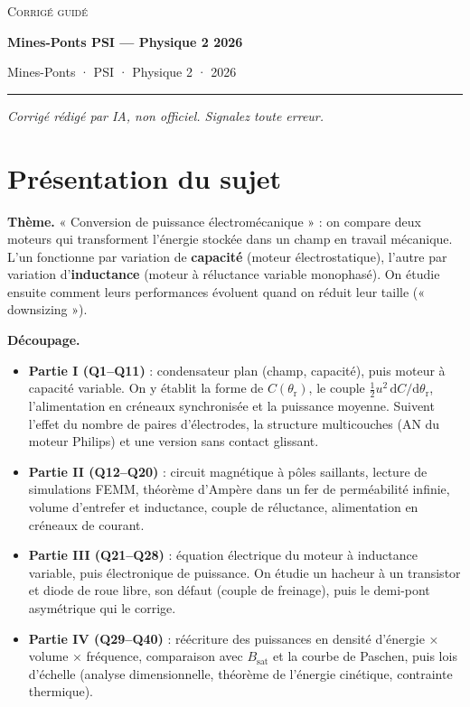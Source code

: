 \documentclass[11pt,a4paper]{article}
\providecommand{\tightlist}{\setlength{\itemsep}{0pt}\setlength{\parskip}{0pt}}
\begin{document}
\thispagestyle{plain}
\begin{center}
  {\small\scshape Corrigé guidé}\par\smallskip
  {\LARGE\bfseries Mines-Ponts PSI — Physique 2 2026\par}\medskip
  {\large Mines-Ponts · PSI · Physique 2 · 2026\par}
\end{center}
\vspace{2pt}\hrule\vspace{8pt}

\emph{Corrigé rédigé par IA, non officiel. Signalez toute erreur.}

\hypertarget{pruxe9sentation-du-sujet}{%
\section{Présentation du sujet}\label{pruxe9sentation-du-sujet}}

\textbf{Thème.} « Conversion de puissance électromécanique » : on compare deux moteurs qui transforment l'énergie stockée dans un champ en travail mécanique. L'un fonctionne par variation de \textbf{capacité} (moteur électrostatique), l'autre par variation d'\textbf{inductance} (moteur à réluctance variable monophasé). On étudie ensuite comment leurs performances évoluent quand on réduit leur taille (« downsizing »).

\textbf{Découpage.}

\begin{itemize}
\tightlist
\item
  \textbf{Partie I (Q1--Q11)} : condensateur plan (champ, capacité), puis moteur à capacité variable. On y établit la forme de \(C(\theta_{\mathrm r})\), le couple \(\tfrac12u^2\,\mathrm dC/\mathrm d\theta_{\mathrm r}\), l'alimentation en créneaux synchronisée et la puissance moyenne. Suivent l'effet du nombre de paires d'électrodes, la structure multicouches (AN du moteur Philips) et une version sans contact glissant.
\item
  \textbf{Partie II (Q12--Q20)} : circuit magnétique à pôles saillants, lecture de simulations FEMM, théorème d'Ampère dans un fer de perméabilité infinie, volume d'entrefer et inductance, couple de réluctance, alimentation en créneaux de courant.
\item
  \textbf{Partie III (Q21--Q28)} : équation électrique du moteur à inductance variable, puis électronique de puissance. On étudie un hacheur à un transistor et diode de roue libre, son défaut (couple de freinage), puis le demi-pont asymétrique qui le corrige.
\item
  \textbf{Partie IV (Q29--Q40)} : réécriture des puissances en densité d'énergie × volume × fréquence, comparaison avec \(B_{\text{sat}}\) et la courbe de Paschen, puis lois d'échelle (analyse dimensionnelle, théorème de l'énergie cinétique, contrainte thermique).
\end{itemize}
\end{document}
